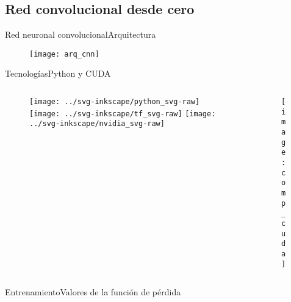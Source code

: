 \documentclass[aspectratio = 169]{beamer}
\begin{document}
		\subsection{Red convolucional desde cero}
		
			\begin{frame}{Red neuronal convolucional}{Arquitectura}
				\begin{figure}
					\centering
					\texttt{[image: arq\_cnn]}
					\label{fig:arq_cnn}
				\end{figure}
			\end{frame}
			\begin{frame}{Tecnologías}{Python y CUDA}
				\begin{columns}
					\begin{column}{.5\textwidth}
						\begin{figure}
							\centering
							\texttt{[image: ../svg-inkscape/python\_svg-raw]}\hfill
							\texttt{[image: ../svg-inkscape/tf\_svg-raw]}\hfill
							\texttt{[image: ../svg-inkscape/nvidia\_svg-raw]}\hfill
						\end{figure}
					\end{column}
					\begin{column}{.5\textwidth}
						\begin{figure}
							\centering
							\texttt{[image: comp\_cuda]}
							\label{fig:comparativa_cuda}
						\end{figure}
					\end{column}
				\end{columns}
			\end{frame}
			\begin{frame}{Entrenamiento}{Valores de la función de pérdida}
				\begin{columns}
					\begin{column}{.7\textwidth}
						\begin{block}{}
							\begin{figure}
								\centering
								
								\label{fig:tb_cnn_c}
							\end{figure}
						\end{block}
					\end{column}
				\end{columns}
			\end{frame}
			
\end{document}
